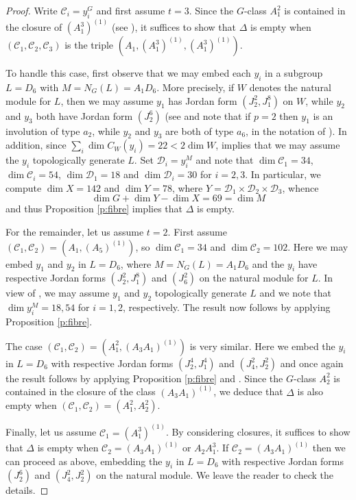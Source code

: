 \documentclass[twoside,a4paper,reqno,11pt]{amsart}
\newcommand{\<}{\langle}
\renewcommand{\>}{\rangle}
\renewcommand{\:}{\colon}
\theoremstyle{plain}
\theoremstyle{definition}
\begin{document}
\begin{proof}
Write $\mathcal{C}_i = y_i^G$ and first assume $t=3$. Since the $G$-class $A_1^2$  is contained in the closure of $(A_1^3)^{(1)}$ (see \cite[Chapter 4]{Spal}), it suffices to show that $\Delta$ is empty when $(\mathcal{C}_1,\mathcal{C}_2,\mathcal{C}_3)$ is the triple $(A_1,(A_1^3)^{(1)},(A_1^3)^{(1)})$. 

To handle this case, first observe that we may embed each $y_i$ in a subgroup $L = D_6$ with $M = N_G(L) = A_1D_6$. More precisely, if $W$ denotes the natural module for $L$, then we may assume $y_1$ has Jordan form $(J_2^2,J_1^8)$ on $W$, while $y_2$ and $y_3$ both have Jordan form $(J_2^6)$ (see \cite[Section 4.10]{Law2} and  note that if $p=2$ then $y_1$ is an involution of type $a_2$, while $y_2$ and $y_3$ are both of type $a_6$, in the notation of \cite{AS}). In addition, since $\sum_i \dim C_W(y_i) = 22 < 2\dim W$, \cite[Theorem 7]{BGG2} implies that we may assume the $y_i$ topologically generate $L$. Set $\mathcal{D}_i = y_i^M$ and note that $\dim \mathcal{C}_1 = 34$, $\dim \mathcal{C}_i = 54$, $\dim \mathcal{D}_1 = 18$ and $\dim \mathcal{D}_i = 30$ for $i=2,3$. In particular, we compute $\dim X =  142$ and $\dim Y = 78$, where $Y = \mathcal{D}_1 \times \mathcal{D}_2 \times \mathcal{D}_3$, whence
\[
\dim G + \dim Y  - \dim X = 69 = \dim M
\]
and thus Proposition \ref{p:fibre} implies that $\Delta$ is empty.

For the remainder, let us assume $t=2$. First assume $(\mathcal{C}_1,\mathcal{C}_2) = (A_1,(A_5)^{(1)})$, so $\dim \mathcal{C}_1 = 34$ and $\dim \mathcal{C}_2 = 102$. Here we may embed $y_1$ and $y_2$ in $L = D_6$, where $M = N_G(L) = A_1D_6$ and the $y_i$ have respective Jordan forms $(J_2^2,J_1^8)$ and $(J_6^2)$ on the natural module for $L$. In view of \cite[Theorem 7]{BGG2}, we may assume $y_1$ and $y_2$ topologically generate $L$ and we note that $\dim y_i^M = 18,54$ for $i=1,2$, respectively. The result now follows by applying Proposition \ref{p:fibre}. 

The case $(\mathcal{C}_1,\mathcal{C}_2) = (A_1^2, (A_3A_1)^{(1)})$ is very similar. Here we embed the $y_i$ in $L = D_6$ with respective Jordan forms $(J_2^4,J_1^4)$ and $(J_4^2,J_2^2)$  and once again the result follows by applying Proposition \ref{p:fibre} and \cite[Theorem 7]{BGG2}. Since the $G$-class $A_2^2$ is contained in the closure of the class $(A_3A_1)^{(1)}$, we deduce that $\Delta$ is also empty when $(\mathcal{C}_1,\mathcal{C}_2) = (A_1^2,A_2^2)$. 

Finally, let us assume $\mathcal{C}_1 = (A_1^3)^{(1)}$. By considering closures, it suffices to show that $\Delta$ is empty when $\mathcal{C}_2 = (A_3A_1)^{(1)}$ or $A_2A_1^3$. If $\mathcal{C}_2 = (A_3A_1)^{(1)}$ then we can proceed as above, embedding the $y_i$ in $L = D_6$ with respective Jordan forms $(J_2^6)$ and $(J_4^2,J_2^2)$ on the natural module. We leave the reader to check the details. 


\end{proof}
\end{document}
